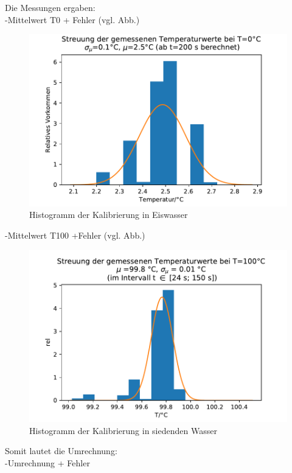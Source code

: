 \documentclass[]{article}
\begin{document}
Die Messungen ergaben:\\
-Mittelwert T0 + Fehler (vgl. Abb.)\\
\begin{figure}
	\begin{center}
		\includegraphics[scale=0.9]{Images/Kalib_T_0_histo.pdf}
		\caption{Histogramm der Kalibrierung in Eiswasser}
		\label{K_T0_histo}
	\end{center}
\end{figure}
-Mittelwert T100 +Fehler (vgl. Abb.)\\
\begin{figure}
	\begin{center}
		\includegraphics[scale=0.9]{Images/Kalib_T_histo_100}
		\caption{Histogramm der Kalibrierung in siedenden Wasser}
		\label{K_T100_histo}
	\end{center}
\end{figure}
Somit lautet die Umrechnung:\\
-Umrechnung + Fehler\\
\end{document}
